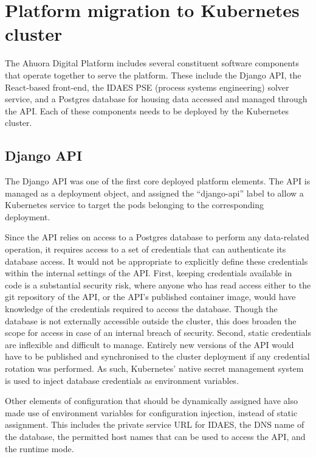 \section{Platform migration to Kubernetes cluster}

The Ahuora Digital Platform includes several constituent software components that operate together to serve the platform. These include the Django API, the React-based front-end, the IDAES PSE (process systems engineering) solver service, and a Postgres database for housing data accessed and managed through the API. Each of these components needs to be deployed by the Kubernetes cluster.

\subsection{Django API}

The Django API was one of the first core deployed platform elements. The API is managed as a deployment object, and assigned the ``django-api'' label to allow a Kubernetes service to target the pods belonging to the corresponding deployment. 

Since the API relies on access to a Postgres database to perform any data-related operation, it requires access to a set of credentials that can authenticate its database access. It would not be appropriate to explicitly define these credentials within the internal settings of the API. First, keeping credentials available in code is a substantial security risk, where anyone who has read access either to the git repository of the API, or the API's published container image, would have knowledge of the credentials required to access the database. Though the database is not externally accessible outside the cluster, this does broaden the scope for access in case of an internal breach of security. Second, static credentials are inflexible and difficult to manage. Entirely new versions of the API would have to be published and synchronised to the cluster deployment if any credential rotation was performed. As such, Kubernetes' native secret management system is used to inject database credentials as environment variables.

Other elements of configuration that should be dynamically assigned have also made use of environment variables for configuration injection, instead of static assignment. This includes the private service URL for IDAES, the DNS name of the database, the permitted host names that can be used to access the API, and the runtime mode.

